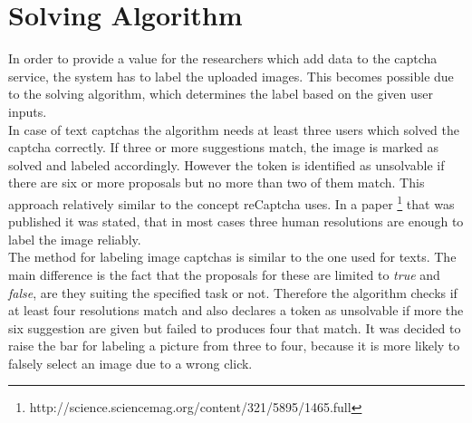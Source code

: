 \section{Solving Algorithm}
\label{sec:solving_algorithm}

In order to provide a value for the researchers which add data to the captcha service, the system has to label the uploaded images. This becomes possible due to the solving algorithm, which determines the label based on the given user inputs. \\
In case of text captchas the algorithm needs at least three users which solved the captcha correctly. If three or more suggestions match, the image is marked as solved and labeled accordingly. However the token is identified as unsolvable if there are six or more proposals but no more than two of them match. This approach relatively similar to the concept reCaptcha uses. In a paper \footnote{http://science.sciencemag.org/content/321/5895/1465.full} that was published it was stated, that in most cases three human resolutions are enough to label the image reliably. \\
The method for labeling image captchas is similar to the one used for texts. The main difference is the fact that the proposals for these are limited to \textit{true} and \textit{false}, are they suiting the specified task or not. Therefore the algorithm checks if at least four resolutions match and also declares a token as unsolvable if more the six suggestion are given but failed to produces four that match. It was decided to raise the bar for labeling a picture from three to four, because it is more likely to falsely select an image due to a wrong click.